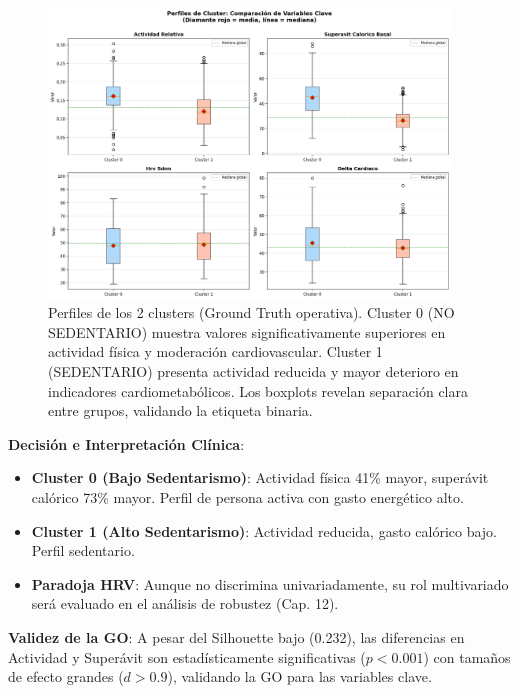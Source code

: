 \documentclass[12pt,letterpaper,twoside]{report}
\begin{document}
\begin{calculobox}
\begin{figure}[htbp]
\centering
\includegraphics[width=0.95\textwidth]{figuras/cluster_profiles_boxplots.png}
\caption{Perfiles de los 2 clusters (Ground Truth operativa). Cluster 0 (NO SEDENTARIO) muestra valores significativamente superiores en actividad física y moderación cardiovascular. Cluster 1 (SEDENTARIO) presenta actividad reducida y mayor deterioro en indicadores cardiometabólicos. Los boxplots revelan separación clara entre grupos, validando la etiqueta binaria.}
\label{fig:cluster_profiles}
\end{figure}

\begin{decisionbox}
\textbf{Decisión e Interpretación Clínica}:

\begin{itemize}[noitemsep]
    \item \textbf{Cluster 0 (Bajo Sedentarismo)}: Actividad física 41\% mayor, superávit calórico 73\% mayor. Perfil de persona activa con gasto energético alto.
    \item \textbf{Cluster 1 (Alto Sedentarismo)}: Actividad reducida, gasto calórico bajo. Perfil sedentario.
    \item \textbf{Paradoja HRV}: Aunque no discrimina univariadamente, su rol multivariado será evaluado en el análisis de robustez (Cap. 12).
\end{itemize}

\textbf{Validez de la GO}: A pesar del Silhouette bajo (0.232), las diferencias en Actividad y Superávit son estadísticamente significativas ($p<0.001$) con tamaños de efecto grandes ($d>0.9$), validando la GO para las variables clave.
\end{decisionbox}


\end{calculobox}
\end{document}
